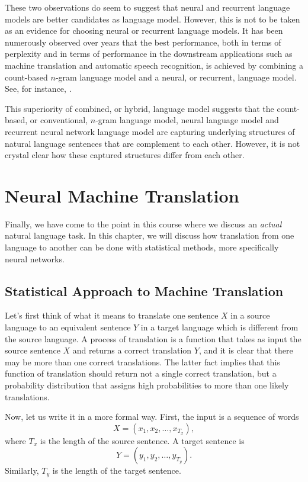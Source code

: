 \documentclass{report}
\begin{document}
These two observations do seem to suggest that neural and recurrent language
models are better candidates as language model. However, this is not to be taken
as an evidence for choosing neural or recurrent language models. It has been
numerously observed over years that the best performance, both in terms of
perplexity and in terms of performance in the downstream applications such as
machine translation and automatic speech recognition, is achieved by combining
a count-based $n$-gram language model and a neural, or recurrent, language
model. See, for instance, \cite{schwenk2007continuous}.

This superiority of combined, or hybrid, language model suggests that the
count-based, or conventional, $n$-gram language model, neural language model and
recurrent neural network language model are capturing underlying structures of
natural language sentences that are complement to each other. However, it is not
crystal clear how these captured structures differ from each other.

\chapter{Neural Machine Translation}

Finally, we have come to the point in this course where we discuss an {\em
actual} natural language task. In this chapter, we will discuss how translation
from one language to another can be done with statistical methods, more
specifically neural networks.

\section{Statistical Approach to Machine Translation}

Let's first think of what it means to translate one sentence $X$ in a source
language to an equivalent sentence $Y$ in a target language which is different
from the source language. A process of translation is a function that takes as
input the source sentence $X$ and returns a correct translation $Y$, and it is
clear that there may be more than one correct translations. The latter fact
implies that this function of translation should return not a single correct
translation, but a probability distribution that assigns high probabilities to
more than one likely translations.

Now, let us write it in a more formal way. First, the input is a sequence of
words
\[
    X = (x_1, x_2, \ldots, x_{T_x}),
\]
where $T_x$ is the length of the source sentence. A target sentence is 
\[
Y = (y_1, y_2, \ldots, y_{T_y}).
\]
Similarly, $T_y$ is the length of the target sentence.
\end{document}
